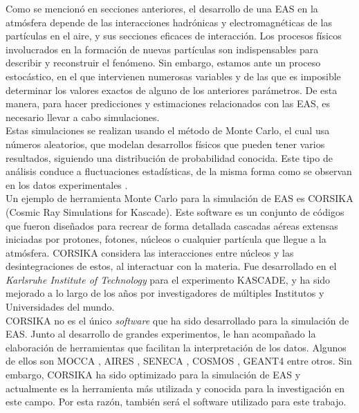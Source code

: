 Como se mencionó en secciones anteriores, el desarrollo de una EAS en la atmósfera depende de las interacciones hadrónicas y electromagnéticas de las partículas en el aire, y sus secciones eficaces de interacción. Los procesos físicos involucrados en la formación de nuevas partículas son indispensables para describir y reconstruir el fenómeno. Sin embargo, estamos ante un proceso estocástico, en el que intervienen numerosas variables y de las que es imposible determinar los valores exactos de alguno de los anteriores parámetros. De esta manera, para hacer predicciones y estimaciones relacionados con las EAS, es necesario llevar a cabo simulaciones.\\

Estas simulaciones se realizan usando el método de Monte Carlo, el cual usa números aleatorios, que modelan desarrollos físicos que pueden tener varios resultados, siguiendo una distribución de probabilidad conocida. Este tipo de análisis conduce a fluctuaciones estadísticas, de la misma forma como se observan en los datos experimentales \parencite{Alania}.\\

Un ejemplo de herramienta Monte Carlo para la simulación de EAS es CORSIKA (Cosmic Ray Simulations for Kascade). Este software es un conjunto de códigos que fueron diseñados para recrear de forma detallada cascadas aéreas extensas iniciadas por protones, fotones, núcleos o cualquier partícula que llegue a la atmósfera. CORSIKA considera las interacciones entre núcleos y las desintegraciones de estos, al interactuar con la materia. Fue desarrollado en el \textit{Karlsruhe Institute of Technology} para el experimento KASCADE, \parencite{Heck1998} y ha sido mejorado a lo largo de los años por investigadores de múltiples Institutos y Universidades del mundo. \\

CORSIKA no es el único \textit{software} que ha sido desarrollado para la simulación de EAS. Junto al desarrollo de grandes experimentos, le han acompañado la elaboración de herramientas que facilitan la interpretación de los datos. Algunos de ellos son MOCCA \parencite{Engel2018}, AIRES \parencite{Engel2018}, SENECA \parencite{Engel2018}, COSMOS \parencite{Engel2018}, GEANT4 \parencite{Engel2018} entre otros. Sin embargo, CORSIKA ha sido optimizado para la simulación de EAS y actualmente es la herramienta más utilizada y conocida para la investigación en este campo. Por esta razón, también será el software utilizado para este trabajo.\\

